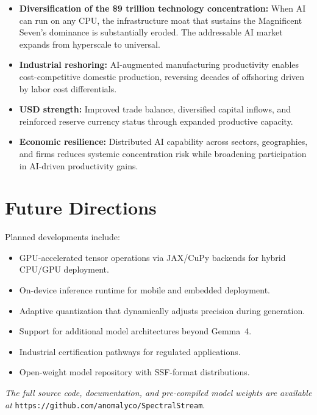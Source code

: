 \documentclass[11pt,a4paper,openright]{book}
\begin{document}
\begin{itemize}
	\item \textbf{Diversification of the \$9 trillion technology concentration:} When AI can run on any CPU, the infrastructure moat that sustains the Magnificent Seven's dominance is substantially eroded. The addressable AI market expands from hyperscale to universal.
	\item \textbf{Industrial reshoring:} AI-augmented manufacturing productivity enables cost-competitive domestic production, reversing decades of offshoring driven by labor cost differentials.
	\item \textbf{USD strength:} Improved trade balance, diversified capital inflows, and reinforced reserve currency status through expanded productive capacity.
	\item \textbf{Economic resilience:} Distributed AI capability across sectors, geographies, and firms reduces systemic concentration risk while broadening participation in AI-driven productivity gains.
\end{itemize}

\section{Future Directions}

Planned developments include:
\begin{itemize}
	\item GPU-accelerated tensor operations via JAX/CuPy backends for hybrid CPU/GPU deployment.
	\item On-device inference runtime for mobile and embedded deployment.
	\item Adaptive quantization that dynamically adjusts precision during generation.
	\item Support for additional model architectures beyond Gemma~4.
	\item Industrial certification pathways for regulated applications.
	\item Open-weight model repository with SSF-format distributions.
\end{itemize}

\vspace{2em}
\noindent\textit{The full source code, documentation, and pre-compiled model weights are available at}
\texttt{https://github.com/anomalyco/SpectralStream}.

\end{document}
